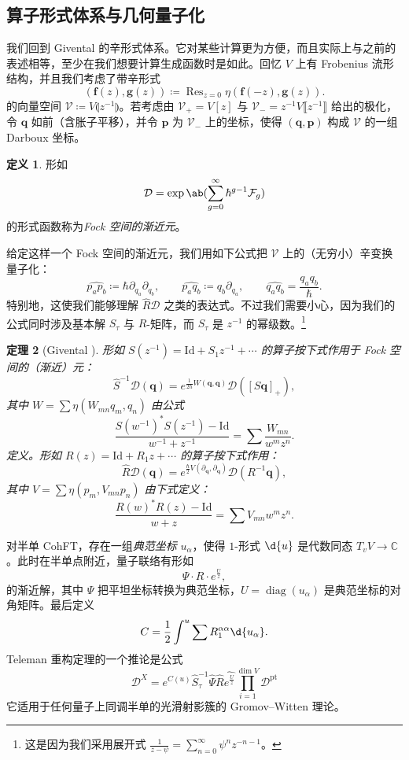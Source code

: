 \documentclass{amsart}
\newtheorem{thm}{定理}[section]
\theoremstyle{definition}
\newtheorem{defn}[thm]{定义}
\theoremstyle{remark}
\theoremstyle{plain}
\theoremstyle{definition}
\theoremstyle{remark}
\newcommand{\C}{\mathbb{C}}
\newcommand{\mc}[1]{\mathcal{#1}}
\newcommand{\mbf}[1]{\mathbf{#1}}
\newcommand{\bq}{\mbf{q}}
\newcommand{\bp}{\mbf{p}}
\newcommand{\mr}[1]{\mathrm{#1}}
\newcommand{\on}[1]{\operatorname{#1}}
\newcommand{\wh}[1]{\widehat{#1}}
\newcommand{\1}{\mathbf{1}}
\newcommand{\2}{\mathbf{2}}
\newcommand{\3}{\mathbf{3}}
\newcommand{\ps}[1]{\llbracket #1 \rrbracket}
\newcommand{\ls}[1]{\llparenthesis #1 \rrparenthesis}
\begin{document}
\subsection{算子形式体系与几何量子化}%
\label{sub:Operator formalism and geometric quantization}

我们回到 Givental 的辛形式体系。它对某些计算更为方便，而且实际上与之前的表述相等，至少在我们想要计算生成函数时是如此。回忆 $V$ 上有 Frobenius 流形结构，并且我们考虑了带辛形式
\[ (\mbf{f}(z), \mbf{g}(z)) \coloneqq \on{Res}_{z=0} \eta(\mbf{f}(-z), \mbf{g}(z)). \]
的向量空间 $\mc{V}\coloneqq V\ls{z^{-1}}$。若考虑由 $\mc{V}_+ = V[z]$ 与 $\mc{V}_- = z^{-1}V\ps{z^{-1}}$ 给出的极化，令 $\bq$ 如前（含胀子平移），并令 $\bp$ 为 $\mc{V}_-$ 上的坐标，使得 $(\bq, \bp)$ 构成 $\mc{V}$ 的一组 Darboux 坐标。

\begin{defn}
    形如
    \[ \mc{D} = \exp\ab(\sum_{g=0}^{\infty} \hbar^{g-1} \mc{F}_g) \]
    的形式函数称为\textit{Fock 空间的渐近元}。
\end{defn}

给定这样一个 Fock 空间的渐近元，我们用如下公式把 $\mc{V}$ 上的（无穷小）辛变换量子化：
\[ \wh{p_a p_b} \coloneqq \hbar \partial_{q_a} \partial_{q_b}, \qquad \wh{p_a q_b} \coloneqq q_b \partial_{q_a}, \qquad \wh{q_a q_b} = \frac{q_a q_b}{\hbar}. \]
特别地，这使我们能够理解 $\hat{R} \mc{D}$ 之类的表达式。不过我们需要小心，因为我们的公式同时涉及基本解 $S_{\tau}$ 与 $R$-矩阵，而 $S_{\tau}$ 是 $z^{-1}$ 的幂级数。\footnote{这是因为我们采用展开式 $\frac{1}{z-\psi} = \sum_{n=0}^{\infty} \psi^n z^{-n-1}$。}

\begin{thm}[Givental {\cite{Givental2001quantization}}]
    形如 $S(z^{-1}) = \mr{Id} + S_1 z^{-1} + \cdots$ 的算子按下式作用于 Fock 空间的（渐近）元：
    \[ \hat{S}^{-1} \mc{D}(\bq) = e^{\frac{1}{2\hbar}W(\bq,\bq)} \mc{D}([S \bq]_+), \]
    其中 $W = \sum \eta(W_{mn}q_m, q_n)$ 由公式
    \[ \frac{S(w^{-1})^* S(z^{-1}) - \mr{Id}}{w^{-1}+z^{-1}} = \sum \frac{W_{mn}}{w^m z^n}. \]
    定义。形如 $R(z) = \mr{Id} + R_1 z + \cdots$ 的算子按下式作用：
    \[ \hat{R}\mc{D}(\bq) = e^{\frac{\hbar}{2} V(\partial_{\bq}, \partial_{\bq})} \mc{D}(R^{-1} \bq), \]
    其中 $V = \sum \eta(p_m, V_{mn} p_n)$ 由下式定义：
    \[ \frac{R(w)^* R(z) - \mr{Id}}{w+z} = \sum V_{mn} w^m z^n. \]
\end{thm}

对半单 CohFT，存在一组\textit{典范坐标} $u_{\alpha}$，使得 $1$-形式 $\d{u}$ 是代数同态 $T_v V \to \C$。此时在半单点附近，量子联络有形如
\[ \Psi \cdot  R \cdot e^{\frac{U}{z}}, \]
的渐近解，其中 $\Psi$ 把平坦坐标转换为典范坐标，$U = \on{diag}(u_{\alpha})$ 是典范坐标的对角矩阵。最后定义
\[ C = \frac{1}{2} \int^u \sum R_1^{\alpha\alpha} \d{u_{\alpha}}. \]
Teleman 重构定理的一个推论是公式
\[ \mc{D}^X = e^{C(u)} \hat{S}^{-1}_{\tau} \hat{\Psi} \hat{R} \wh{e^{\frac{U}{z}}} \prod_{i=1}^{\dim V} \mc{D}^{\mr{pt}} \]
它适用于任何量子上同调半单的光滑射影簇的 Gromov--Witten 理论。
\end{document}
